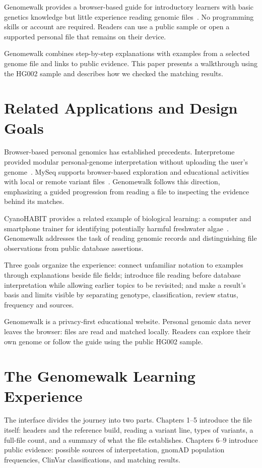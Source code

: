\documentclass[runningheads]{llncs}
\begin{document}
Genomewalk provides a browser-based guide for introductory learners with basic genetics knowledge but little experience reading genomic files~\cite{genomewalk}. No programming skills or account are required. Readers can use a public sample or open a supported personal file that remains on their device.

Genomewalk combines step-by-step explanations with examples from a selected genome file and links to public evidence. This paper presents a walkthrough using the HG002 sample and describes how we checked the matching results.

\section{Related Applications and Design Goals}
Browser-based personal genomics has established precedents. Interpretome provided modular personal-genome interpretation without uploading the user's genome~\cite{interpretome}. MySeq supports browser-based exploration and educational activities with local or remote variant files~\cite{myseq}. Genomewalk follows this direction, emphasizing a guided progression from reading a file to inspecting the evidence behind its matches.

CyanoHABIT provides a related example of biological learning: a computer and smartphone trainer for identifying potentially harmful freshwater algae~\cite{cyanohabit}. Genomewalk addresses the task of reading genomic records and distinguishing file observations from public database assertions.

Three goals organize the experience: connect unfamiliar notation to examples through explanations beside file fields; introduce file reading before database interpretation while allowing earlier topics to be revisited; and make a result's basis and limits visible by separating genotype, classification, review status, frequency and sources.

Genomewalk is a privacy-first educational website. Personal genomic data never leaves the browser: files are read and matched locally. Readers can explore their own genome or follow the guide using the public HG002 sample.

\section{The Genomewalk Learning Experience}
The interface divides the journey into two parts. Chapters 1--5 introduce the file itself: headers and the reference build, reading a variant line, types of variants, a full-file count, and a summary of what the file establishes. Chapters 6--9 introduce public evidence: possible sources of interpretation, gnomAD population frequencies, ClinVar classifications, and matching results.
\end{document}
